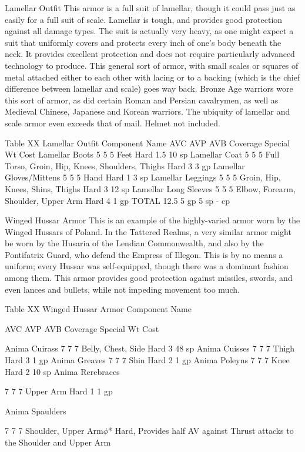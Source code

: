 \documentclass[oneside,11pt,english]{book}
\begin{document}
 

Lamellar Outfit 
This armor is a full suit of lamellar, though it could pass just as easily for a full suit of scale. Lamellar is 
tough, and provides good protection against all damage types. The suit is actually very heavy, as one 
might expect a suit that uniformly covers and protects every inch of one's body beneath the neck. It 
provides excellent protection and does not require particularly advanced technology to produce. This 
general sort of armor, with small scales or squares of metal attached either to each other with lacing or to 
a backing (which is the chief difference between lamellar and scale) goes way back. Bronze Age warriors 
wore this sort of armor, as did certain Roman and Persian cavalrymen, as well as Medieval Chinese, 
Japanese and Korean warriors. The ubiquity of lamellar and scale armor even exceeds that of mail. 
Helmet not included. 

 
Table XX Lamellar Outfit 
Component Name AVC AVP AVB Coverage Special Wt Cost 
Lamellar Boots 5 5 5 Feet Hard 1.5 10 sp 
Lamellar Coat 5 5 5 Full Torso, Groin, Hip, Knees, Shoulders, Thighs Hard 3 3 gp 
Lamellar Gloves/Mittens 5 5 5 Hand Hard 1 3 sp 
Lamellar Leggings 5 5 5 Groin, Hip, Knees, Shins, Thighs Hard 3 12 sp 
Lamellar Long Sleeves 5 5 5 Elbow, Forearm, Shoulder, Upper Arm Hard 4 1 gp 
TOTAL 12.5 5 gp 
5 sp 
- cp 

 


Winged Hussar Armor 
This is an example of the highly-varied armor worn by the Winged Hussars of Poland. In the Tattered 
Realms, a very similar armor might be worn by the Husaria of the Lendian Commonwealth, and also by 
the Pontifatrix Guard, who defend the Empress of Illegon. This is by no means a uniform; every Hussar 
was self-equipped, though there was a dominant fashion among them. This armor provides good 
protection against missiles, swords, and even lances and bullets, while not impeding movement too much. 

 
Table XX Winged Hussar Armor 
Component 
Name 

AVC AVP AVB Coverage Special Wt Cost 

Anima Cuirass 7 7 7 Belly, Chest, Side Hard 3 48 
sp 
Anima Cuisses 7 7 7 Thigh Hard 3 1 gp 
Anima Greaves 7 7 7 Shin Hard 2 1 gp 
Anima Poleyns 7 7 7 Knee Hard 2 10 
sp 
Anima 
Rerebraces 

7 7 7 Upper Arm Hard 1 1 gp 

Anima 
Spaulders 

7 7 7 Shoulder, Upper Arm$\phi$* Hard, Provides half AV against Thrust 
attacks to the Shoulder and Upper Arm 
\end{document}
